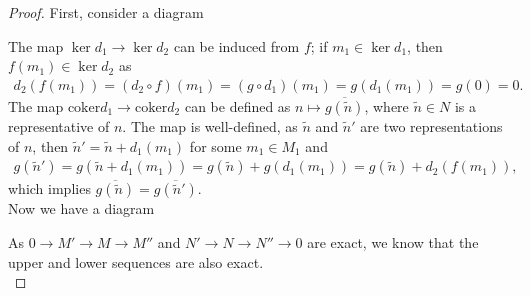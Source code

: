 \documentclass[12pt]{report}
\theoremstyle{plain}
\theoremstyle{remark}
\theoremstyle{definition}
\begin{document}
\begin{proof}
    First, consider a diagram
    \begin{figure}[H]
        \centering
    \end{figure}
    \noindent The map $\ker d_1\rightarrow \ker d_2$ can be induced from $f$; if $m_1\in \ker d_1$, then $f(m_1)\in \ker d_2$ as
    \begin{align*}
        d_2(f(m_1)) = (d_2\circ f)(m_1) = (g\circ d_1)(m_1) = g(d_1(m_1))=g(0)=0.
    \end{align*}
    The map $\mathrm{coker}d_1\rightarrow \mathrm{coker}d_2$ can be defined as $n\mapsto \overline{g(\tilde{n})}$, where $\tilde{n}\in N$ is a representative of $n$. The map is well-defined, as $\tilde{n}$ and $\tilde{n}'$ are two representations of $n$, then $\tilde{n}' = \tilde{n}+d_1(m_1)$ for some $m_1\in M_1$ and
    \begin{align*}
        g(\tilde{n}') = g(\tilde{n}+d_1(m_1)) = g(\tilde{n})+g(d_1(m_1)) = g(\tilde{n})+d_2(f(m_1)),
    \end{align*}
    which implies $\overline{g(\tilde{n})}=\overline{g(\tilde{n}')}$. \\
    Now we have a diagram
    \begin{figure}[H]
        \centering
    \end{figure}
    \noindent As $0\to M'\to M\to M''$ and $N'\to N\to N''\to 0$ are exact, we know that the upper and lower sequences are also exact. \\

\end{proof}
\end{document}
